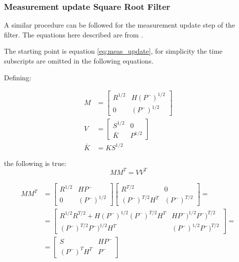 \documentclass{article}
\begin{document}
\subsubsection{Measurement update Square Root Filter}

A similar procedure can be followed for the measurement update step of the filter. The equations here described are from \cite{dan_simon_optimal_2006}.

The starting point is equation \ref{eq:meas_update}, for simplicity the time subscripts are omitted in the following equations.

Defining:

\begin{align}
    M &= \begin{bmatrix} R^{1/2} & H(P^-)^{1/2} \\ 0 & (P^-)^{1/2} \end{bmatrix} \\
    V &= \begin{bmatrix} S^{1/2} & 0 \\ \bar{K} & P^{1/2} \end{bmatrix} \\
    \bar{K} &= KS^{1/2}
\end{align}
    
the following is true:
\begin{equation}\label{update_SR_mult}
    MM^T = VV^T
\end{equation}

\begin{equation}
\begin{split}
    MM^T &= \begin{bmatrix} R^{1/2} & HP^- \\ 0 & (P^-)^{1/2} \end{bmatrix}\begin{bmatrix} R^{T/2} & 0 \\ (P^-)^{T/2}H^T & (P^-)^{T/2} \end{bmatrix}= \\
    &=\begin{bmatrix} R^{1/2}R^{T/2} + H(P^-)^{1/2}(P^-)^{T/2}H^T & HP^-)^{1/2}P^-)^{T/2} \\ (P^-)^{T/2}P^-)^{1/2}H^T & (P^-)^{1/2}P^-)^{T/2} \end{bmatrix} = \\
    &=\begin{bmatrix}S & HP^- \\ (P^-)^TH^T & P^- \end{bmatrix}
\end{split}
\end{equation}
\end{document}
